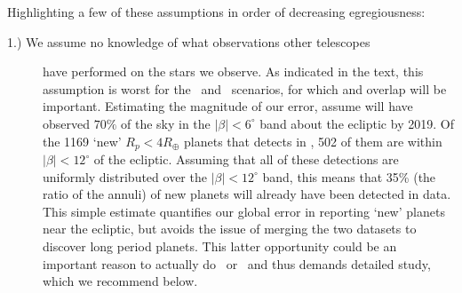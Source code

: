 Highlighting a few of these assumptions in order of decreasing egregiousness:
\begin{description}
	\item[1.) We assume no knowledge of what observations other telescopes] 
	have performed on the stars we observe. 
	As indicated in the text, this assumption is worst for the \elong\ and \eshort\ scenarios, for which \ktwo and \tesss overlap will be important.
	Estimating the magnitude of our error, assume \ktwo will have observed $70\%$ of the sky in the $|\beta|<6^\circ$ band about the ecliptic by 2019.
	Of the 1169 `new' $R_p<4R_\oplus$ planets that \tess detects in \elong, 502 of them are within $|\beta|<12^\circ$ of the ecliptic.
	Assuming that all of these detections are uniformly distributed over the $|\beta|<12^\circ$ band, this means that 35\% (the ratio of the annuli) of \tesss new planets will already have been detected in \ktwo data.
	This simple estimate quantifies our global error in reporting `new' planets near the ecliptic, but avoids the issue of merging the two datasets to discover long period planets.
	This latter opportunity could be an important reason to actually do \elong\ or \eshort\ and thus demands detailed study, which we recommend below.
	

\end{description}
